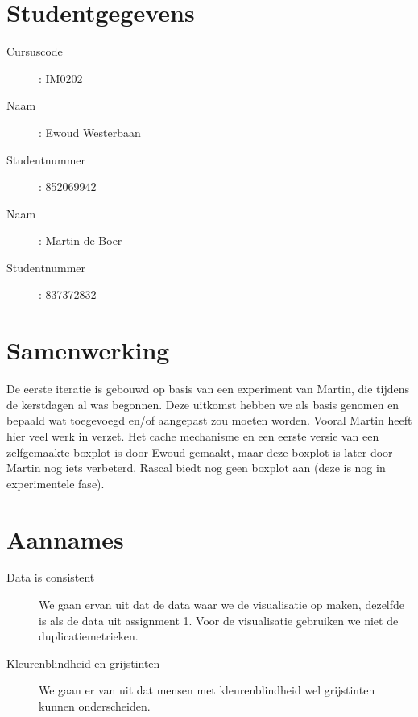 \documentclass[a4paper]{article}
\begin{document}
\pagestyle{fancy}

\section*{Studentgegevens}
\begin{description}
	\item [Cursuscode]: IM0202
	\item [Naam]: Ewoud Westerbaan
	\item [Studentnummer]: 852069942
	\item [Naam]: Martin de Boer
	\item [Studentnummer]: 837372832
\end{description}

\section{Samenwerking}
De eerste iteratie is gebouwd op basis van een experiment van Martin, die tijdens de kerstdagen al was begonnen. Deze uitkomst hebben we als basis genomen en bepaald wat toegevoegd en/of aangepast zou moeten worden. Vooral Martin heeft hier veel werk in verzet.
Het cache mechanisme en een eerste versie van een zelfgemaakte boxplot is door Ewoud gemaakt, maar deze boxplot is later door Martin nog iets verbeterd. Rascal biedt nog geen boxplot aan (deze is nog in experimentele fase).


\section{Aannames}
\begin{description}
\item[Data is consistent] We gaan ervan uit dat de data waar we de visualisatie op maken, dezelfde is als de data uit assignment 1. Voor de visualisatie gebruiken we niet de duplicatiemetrieken.
\item[Kleurenblindheid en grijstinten] We gaan er van uit dat mensen met kleurenblindheid wel grijstinten kunnen onderscheiden.
\end{description}
\end{document}

